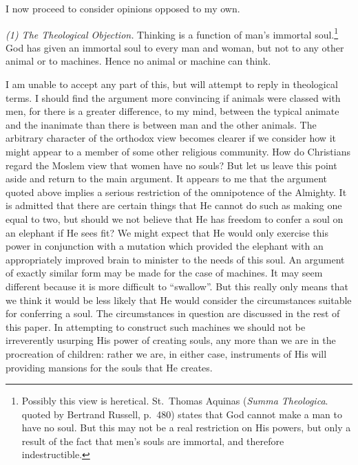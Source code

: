 \documentclass[10pt]{article} %
\begin{document}
I now proceed to consider opinions opposed to my own.
\vspace{0.5\baselineskip} %

\noindent\normalfont \textit{(1) The Theological Objection.} Thinking is a function of man's immortal soul.\footnote{\normalfont\tiny Possibly this view is heretical. St.~Thomas Aquinas (\textit{Summa Theologica}. quoted by Bertrand Russell, p.~480) states that God cannot make a man to have no soul. But this may not be a real restriction on His powers, but only a result of the fact that men's souls are immortal, and therefore indestructible.} God has given an immortal soul to every man and woman, but not to any other animal or to machines. Hence no animal or machine can think.

I am unable to accept any part of this, but will attempt to reply in theological terms. I should find the argument more convincing if animals were classed with men, for there is a greater difference, to my mind, between the typical animate and the inanimate than there is between man and the other animals. The arbitrary character of the orthodox view becomes clearer if we consider how it might appear to a member of some other religious community. How do Christians regard the Moslem view that women have no souls? But let us leave this point aside and return to the main argument. It appears to me that the argument quoted above implies a serious restriction of the omnipotence of the Almighty. It is admitted that there are certain things that He cannot do such as making one equal to two, but should we not believe that He has freedom to confer a soul on an elephant if He sees fit? We might expect that He would only exercise this power in conjunction with a mutation which provided the elephant with an appropriately improved brain to minister to the needs of this soul. An argument of exactly similar form may be made for the case of machines. It may seem different because it is more difficult to ``swallow''. But this really only means that we think it would be less likely that He would consider the circumstances suitable for conferring a soul. The circumstances in question are discussed in the rest of this paper. In attempting to construct such machines we should not be irreverently usurping His power of creating souls, any more than we are in the procreation of children: rather we are, in either case, instruments of His will providing mansions for the souls that He creates.
\end{document}
